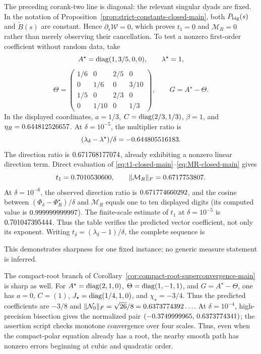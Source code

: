 The preceding corank-two line is diagonal: the relevant singular dyads are
fixed.  In the notation of Proposition~\ref{prop:strict-constants-closed-main},
both \(P_{\rm big}(s)\) and \(\widetilde B(s)\) are constant.  Hence
\(\partial_s\mathcal W=0\), which proves \(t_1=0\) and
\(\mathcal M_R=0\) rather than merely observing their cancellation.  To test a nonzero first-order
coefficient without random data, take
\[
 A^\star=\operatorname{diag}(1,3/5,0,0),\qquad \lambda^\star=1,
\]
\[
 \Theta=
 \begin{pmatrix}
  1/6&0&2/5&0\\
  0&1/6&0&3/10\\
  1/5&0&2/3&0\\
  0&1/10&0&1/3
 \end{pmatrix},
 \qquad G=A^\star-\Theta.
\]
In the displayed coordinates, \(a=1/3\),
\(C=\operatorname{diag}(2/3,1/3)\), \(\beta=1\), and
\(\eta_R=0.644812526657\).  At \(\delta=10^{-5}\), the multiplier ratio is
\[
 (\lambda_\delta-\lambda^\star)/\delta=-0.644805516183.
\]
The direction ratio is \(0.671768177074\), already exhibiting
a nonzero linear direction term.  Direct evaluation of
\eqref{eq:t1-closed-main}--\eqref{eq:MR-closed-main} gives
\[
 t_1=0.7010530600,
 \qquad \|\mathcal M_R\|_F=0.6717753807.
\]
At \(\delta=10^{-6}\), the observed direction ratio is
\(0.671774660292\), and the cosine between
\((\Phi_\delta-\Phi_R^\star)/\delta\) and \(\mathcal M_R\) equals one to
ten displayed digits (its computed value is \(0.999999999997\)).  The finite-scale estimate of
\(t_1\) at \(\delta=10^{-5}\) is \(0.701047395444\).  Thus the table verifies the
predicted vector coefficient, not only its exponent.  Writing
\(t_\delta=(\lambda_\delta-1)/\delta\), the complete sequence is

This demonstrates
sharpness for one fixed instance; no generic measure statement is inferred.

The compact-root branch of
Corollary~\ref{cor:compact-root-superconvergence-main} is sharp as well.
For \(A^\star=\operatorname{diag}(2,1,0)\), \(\Theta=\operatorname{diag}(1,-1,1)\), and
\(G=A^\star-\Theta\), one has \(a=0\), \(C=(1)\),
\(J_\star=\operatorname{diag}(1/4,1,0)\), and \(\chi_\star=-3/4\).  Thus the predicted
coefficients are \(-3/8\) and
\(\|\mathcal N_0\|_F=\sqrt{26}/8=0.6373774392\ldots\).
At \(\delta=10^{-4}\), high-precision bisection gives the normalized pair
\((-0.3749999965,\,0.6373774341)\); the assertion script checks monotone
convergence over four scales.  Thus, even when the compact-polar equation
already has a root, the nearby smooth path has nonzero errors beginning at
cubic and quadratic order.

